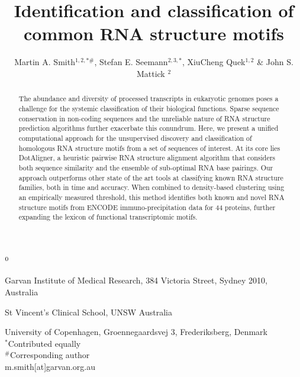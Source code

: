 \documentclass[a4paper,11pt]{article}
\title{Identification and classification of common RNA structure motifs }
\author{Martin A. Smith$^{1,2,*\#}$, Stefan E. Seemann$^{2,3,*}$, XiuCheng Quek$^{1,2}$ \& John S. Mattick $^2$}
\newenvironment{affiliations}{%
    \setcounter{enumi}{1}%
    \setlength{\parindent}{0in}%
    \slshape\sloppy%
    \begin{list}{\upshape$^{\arabic{enumi}}$}{%
        \usecounter{enumi}%
        \setlength{\leftmargin}{0in}%
        \setlength{\topsep}{0in}%
        \setlength{\labelsep}{0in}%
        \setlength{\labelwidth}{0in}%
        \setlength{\listparindent}{0in}%
        \setlength{\itemsep}{0ex}%
        \setlength{\parsep}{0in}%
        }
    }{\end{list}\par\vspace{12pt}}
\begin{document}
\maketitle

\begin{affiliations}
\item Garvan Institute of Medical Research, 384 Victoria Street, Sydney 2010, Australia
\item  St Vincent’s Clinical School, UNSW Australia
\item University of Copenhagen, Groennegaardsvej 3, Frederiksberg, Denmark\\
 $^*$Contributed equally\\
 $^\#$Corresponding author\\
 m.smith[at]garvan.org.au 
\end{affiliations}

\begin{abstract}
\noindent  The abundance  and diversity of processed transcripts in eukaryotic genomes poses a challenge 
for the systemic classification of their biological functions. Sparse sequence conservation in 
non-coding sequences and the unreliable nature of RNA structure prediction algorithms further 
exacerbate this conundrum. Here, we present a unified computational approach for the 
unsupervised discovery and classification of homologous RNA structure motifs from a set of 
sequences of interest.  At its core lies DotAligner, a heuristic pairwise RNA structure alignment 
algorithm that considers both sequence similarity and the ensemble of sub-optimal RNA base pairings.  
Our approach outperforms other state of the art tools at classifying known RNA structure families, 
both in time and accuracy. When combined to density-based clustering using an empirically measured 
threshold, this method identifies both known and novel RNA structure motifs from ENCODE 
immuno-precipitation data for 44 proteins, further expanding the lexicon of functional transcriptomic motifs. 
\end{abstract}

\end{document}

